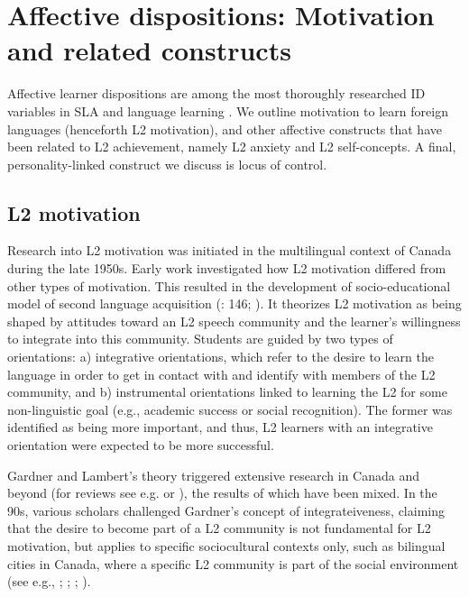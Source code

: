 \documentclass[output=paper]{langscibook}
\begin{document}
\section{Affective dispositions: Motivation and related constructs}\label{sec:01:4}

Affective learner dispositions are among the most thoroughly researched ID variables in SLA and language learning \citep[536]{Ellis2004}. We outline motivation to learn foreign languages (henceforth L2 motivation), and other affective constructs that have been related to L2 achievement, namely L2 anxiety and L2 self-concepts. A final, personality-linked construct we discuss is locus of control. 

\subsection{L2 motivation} %

Research into L2 motivation was initiated in the multilingual context of Canada during the late 1950s. Early work investigated how L2 motivation differed from other types of motivation. This resulted in the development of  socio-educational model of second language acquisition (\citealt{Gardner1985}: 146; \citealt{Gardner2000}). It theorizes L2 motivation as being shaped by attitudes toward an L2 speech community and the learner’s willingness to integrate into this community. Students are guided by two types of orientations: a) integrative orientations, which refer to the desire to learn the language in order to get in contact with and identify with members of the L2 community, and b) instrumental orientations linked to learning the L2 for some non-linguistic goal (e.g., academic success or social recognition). The former was identified as being more important, and thus, L2 learners with an integrative orientation were expected to be more successful.

Gardner and Lambert’s theory triggered extensive research in Canada and beyond (for reviews see e.g. \citealt{Gardner1985} or \citealt{Au1988}), the results of which have been mixed. In the 90s, various scholars challenged Gardner’s concept of integrateiveness, claiming that the desire to become part of a L2 community is not fundamental for L2 motivation, but applies to specific sociocultural contexts only, such as bilingual cities in Canada, where a specific L2 community is part of the social environment (see e.g., \citealt{NoelsClement1989}; \citealt{Doernyei1990}; \citealt{MoiseEtAl1990}; \citealt{ClémentEtAl1994}). 
\end{document}
